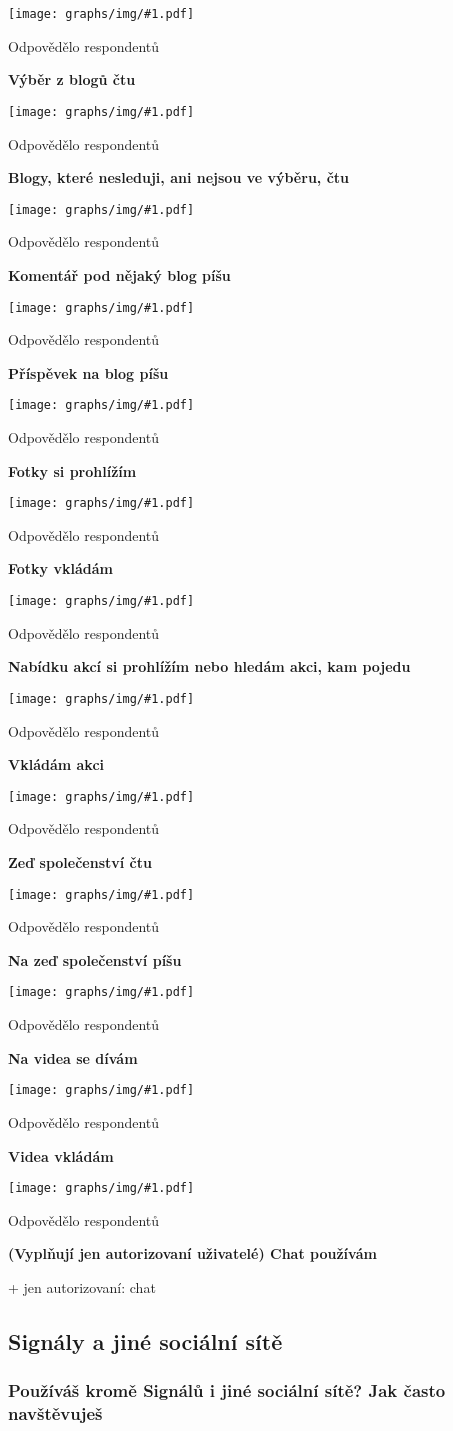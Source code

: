 \documentclass[12pt, a4paper, twoside]{article}
\newcommand{\answercount}[1]{Odpovědělo  respondentů}
\newcommand{\includegraph}[1]{
  \texttt{[image: graphs/img/\#1.pdf]}

  \answercount{#1}
}
\begin{document}
\includegraph{funkcionality_sledovane_blogy_ctu}

\textbf{Výběr z blogů čtu}

\includegraph{funkcionality_blogy_vyber_ctu}

\textbf{Blogy, které nesleduji, ani nejsou ve výběru, čtu}

\includegraph{funkcionality_blogy_nesledovane_ctu}

\textbf{Komentář pod nějaký blog píšu}

\includegraph{funkcionality_blog_komentuji}

\textbf{Příspěvek na blog píšu}

\includegraph{funkcionality_blog_pisu}

\textbf{Fotky si prohlížím}

\includegraph{funkcionality_fotky_prohlizim}

\textbf{Fotky vkládám}

\includegraph{funkcionality_fotky_vkladam}

\textbf{Nabídku akcí si prohlížím nebo hledám akci, kam pojedu}

\includegraph{funkcionality_akce_prohlizim}

\textbf{Vkládám akci}

\includegraph{funkcionality_akce_vkladam}

\textbf{Zeď společenství čtu}

\includegraph{funkcionality_zed_spolecenstvi_ctu}

\textbf{Na zeď společenství píšu}

\includegraph{funkcionality_zed_spolecenstvi_pisu}

\textbf{Na videa se dívám}

\includegraph{funkcionality_videa_prohlizim}

\textbf{Videa vkládám}

\includegraph{funkcionality_videa_vkladam}

\textbf{(Vyplňují jen autorizovaní uživatelé) Chat používám}

+ jen autorizovaní: chat


\subsection{Signály a jiné sociální sítě}\label{sec:jinesite}

\subsubsection{Používáš kromě Signálů i jiné sociální sítě? Jak často navštěvuješ}
\end{document}
